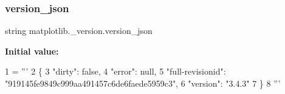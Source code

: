 \subsubsection{\texorpdfstring{version\+\_\+json}{version\_json}}
{\footnotesize\ttfamily string matplotlib.\+\_\+version.\+version\+\_\+json}

{\bfseries Initial value\+:}
\begin{DoxyCode}
1 =  \textcolor{stringliteral}{'''}
2 \textcolor{stringliteral}{\{}
3 \textcolor{stringliteral}{ "dirty": false,}
4 \textcolor{stringliteral}{ "error": null,}
5 \textcolor{stringliteral}{ "full-revisionid": "919145fe9849c999aa491457c6de6faede5959c3",}
6 \textcolor{stringliteral}{ "version": "3.4.3"}
7 \textcolor{stringliteral}{\}}
8 \textcolor{stringliteral}{'''}
\end{DoxyCode}
